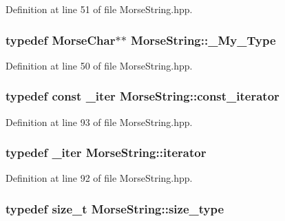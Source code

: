 Definition at line 51 of file Morse\-String.\-hpp.

\hypertarget{class_morse_string_a7f22a5166595e9f06e160159b6b5a878}{
\subsubsection[{\-\_\-\-My\-\_\-\-Type}]{\setlength{\rightskip}{0pt plus 5cm}typedef {\bf Morse\-Char}$\ast$$\ast$ {\bf Morse\-String\-::\-\_\-\-My\-\_\-\-Type}}}\label{class_morse_string_a7f22a5166595e9f06e160159b6b5a878}


Definition at line 50 of file Morse\-String.\-hpp.

\hypertarget{class_morse_string_a8187161e4517b8721bdb562d90200cfd}{
\subsubsection[{const\-\_\-iterator}]{\setlength{\rightskip}{0pt plus 5cm}typedef const {\bf \-\_\-iter} {\bf Morse\-String\-::const\-\_\-iterator}}}\label{class_morse_string_a8187161e4517b8721bdb562d90200cfd}


Definition at line 93 of file Morse\-String.\-hpp.

\hypertarget{class_morse_string_aed59863122221676213d8467a2774601}{
\subsubsection[{iterator}]{\setlength{\rightskip}{0pt plus 5cm}typedef {\bf \-\_\-iter} {\bf Morse\-String\-::iterator}}}\label{class_morse_string_aed59863122221676213d8467a2774601}


Definition at line 92 of file Morse\-String.\-hpp.

\hypertarget{class_morse_string_a87ad452a5f61d3e7468497bdc03a7e6a}{
\subsubsection[{size\-\_\-type}]{\setlength{\rightskip}{0pt plus 5cm}typedef size\-\_\-t {\bf Morse\-String\-::size\-\_\-type}}}\label{class_morse_string_a87ad452a5f61d3e7468497bdc03a7e6a}


